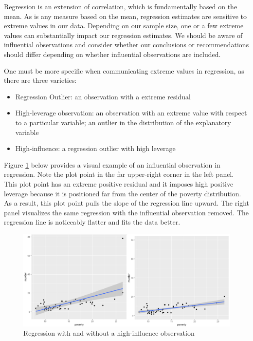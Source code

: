 \documentclass[
]{book}
\providecommand{\tightlist}{%
  \setlength{\itemsep}{0pt}\setlength{\parskip}{0pt}}
\begin{document}
Regression is an extension of correlation, which is fundamentally based on the mean. As is any measure based on the mean, regression estimates are sensitive to extreme values in our data. Depending on our sample size, one or a few extreme values can substantially impact our regression estimates. We should be aware of influential observations and consider whether our conclusions or recommendations should differ depending on whether influential observations are included.

One must be more specific when communicating extreme values in regression, as there are three varieties:

\begin{itemize}
\tightlist
\item
  Regression Outlier: an observation with a extreme residual
\item
  High-leverage observation: an observation with an extreme value with respect to a particular variable; an outlier in the distribution of the explanatory variable
\item
  High-influence: a regression outlier with high leverage
\end{itemize}

Figure \ref{fig:influential} below provides a visual example of an influential observation in regression. Note the plot point in the far upper-right corner in the left panel. This plot point has an extreme positive residual and it imposes high positive leverage because it is positioned far from the center of the poverty distribution. As a result, this plot point pulls the slope of the regression line upward. The right panel visualizes the same regression with the influential observation removed. The regression line is noticeably flatter and fits the data better.

\begin{figure}

{\centering \includegraphics[width=\textwidth]{images/influential} 

}

\caption{Regression with and without a high-influence observation}\label{fig:influential}
\end{figure}
\end{document}

